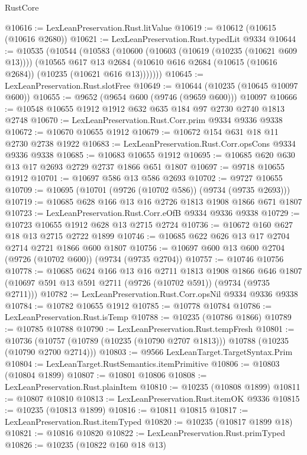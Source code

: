 \begin{lexlean}{RustCore}
\begin{coremodule}
@10616 := LexLeanPreservation.Rust.litValue
@10619 := @10612 (@10615 (@10616 @2680))
@10621 := LexLeanPreservation.Rust.typedLit @9334
@10644 := @10535
    (@10544
      (@10583
        (@10600
          (@10603 (@10619 (@10235 (@10621 @609 @13))))
          (@10565
            @617
            @13
            @2684
            (@10610 @616 @2684 (@10615 (@10616 @2684)) (@10235 (@10621 @616 @13)))))))
@10645 := LexLeanPreservation.Rust.slotFree
@10649 := @10644 (@10235 (@10645 @10097 @600))
@10655 := @9652 (@9654 @600 (@9746 (@9659 @600))) @10097
@10666 := @10548 @10655 @1912 @1912 @632 @635 @184 @97 @2730 @2740 @1813 @2748
@10670 := LexLeanPreservation.Rust.Corr.prim @9334 @9336 @9338
@10672 := @10670 @10655 @1912
@10679 := @10672 @154 @631 @18 @11 @2730 @2738 @1922
@10683 := LexLeanPreservation.Rust.Corr.opsCons @9334 @9336 @9338
@10685 := @10683 @10655 @1912
@10695 := @10685 @620 @630 @13 @17 @2693 @2729 @2737 @1866 @651 @1807
@10697 := @9718 @10655 @1912
@10701 := @10697 @586 @13 @586 @2693
@10702 := @9727 @10655
@10709 := @10695 (@10701 (@9726 (@10702 @586)) (@9734 (@9735 @2693)))
@10719 := @10685 @628 @166 @13 @16 @2726 @1813 @1908 @1866 @671 @1807
@10723 := LexLeanPreservation.Rust.Corr.eOfB @9334 @9336 @9338
@10729 := @10723 @10655 @1912 @628 @13 @2715 @2724
@10736 := @10672 @160 @627 @18 @13 @2715 @2722 @1899
@10746 := @10685 @622 @626 @13 @17 @2704 @2714 @2721 @1866 @600 @1807
@10756 := @10697 @600 @13 @600 @2704 (@9726 (@10702 @600)) (@9734 (@9735 @2704))
@10757 := @10746 @10756
@10778 := @10685
    @624
    @166
    @13
    @16
    @2711
    @1813
    @1908
    @1866
    @646
    @1807
    (@10697 @591 @13 @591 @2711 (@9726 (@10702 @591)) (@9734 (@9735 @2711)))
@10782 := LexLeanPreservation.Rust.Corr.opsNil @9334 @9336 @9338
@10784 := @10782 @10655 @1912
@10785 := @10778 @10784
@10786 := LexLeanPreservation.Rust.isTemp
@10788 := @10235 (@10786 @1866)
@10789 := @10785 @10788
@10790 := LexLeanPreservation.Rust.tempFresh
@10801 := @10736
    (@10757 (@10789 (@10235 (@10790 @2707 @1813))) @10788 (@10235 (@10790 @2700 @2714)))
@10803 := @9566 LexLeanTarget.TargetSyntax.Prim
@10804 := LexLeanTarget.RustSemantics.itemPrimitive
@10806 := @10803 (@10804 @1899)
@10807 := @10801 @10806
@10808 := LexLeanPreservation.Rust.plainItem
@10810 := @10235 (@10808 @1899)
@10811 := @10807 @10810
@10813 := LexLeanPreservation.Rust.itemOK @9336
@10815 := @10235 (@10813 @1899)
@10816 := @10811 @10815
@10817 := LexLeanPreservation.Rust.itemTyped
@10820 := @10235 (@10817 @1899 @18)
@10821 := @10816 @10820
@10822 := LexLeanPreservation.Rust.primTyped
@10826 := @10235 (@10822 @160 @18 @13)

\end{coremodule}
\end{lexlean}
